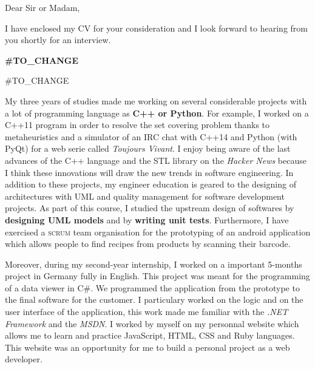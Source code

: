 \date{\today}
\opening{Dear Sir or Madam,}
\closing{I have enclosed my CV for your consideration and I look forward to hearing from you shortly for an interview.}

\makelettertitle

\textbf{#TO_CHANGE}

\introduce{}
#TO_CHANGE

My three years of studies made me working on several considerable projects with a lot of programming language as \textbf{C++ or Python}. For example, I worked on a C++11 program in order to resolve the set covering problem thanks to metaheuristics and a simulator of an IRC chat with C++14 and Python (with PyQt) for a web serie called \textit{Toujours Vivant}. I enjoy being aware of the last advances of the C++ language and the STL library on the \textit{Hacker News} because I think these innovations will draw the new trends in software engineering. In addition to these projects, my engineer education is geared to the designing of architectures with UML and quality management for software development projects. As part of this course, I studied the upstream design of softwares by \textbf{designing UML models} and by \textbf{writing unit tests}. Furthermore, I have exercised a \textsc{scrum} team organisation for the prototyping of an android application which allows people to find recipes from products by scanning their barcode.

Moreover, during my second-year internship, I worked on a important 5-months project in Germany fully in English. This project was meant for the programming of a data viewer in C\#. We programmed the application from the prototype to the final software for the customer. I particulary worked on the logic and on the user interface of the application, this work made me familiar with the \textit{.NET Framework} and the \textit{MSDN}. I worked by myself on my personnal website which allows me to learn and practice JavaScript, HTML, CSS and Ruby languages. This website was an opportunity for me to build a personal project as a web developer. \conclude{}

\makeletterclosing
